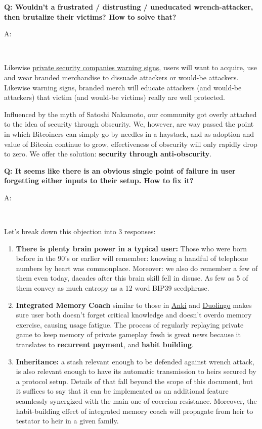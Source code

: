 \documentclass[12pt,a4paper]{article}
\newenvironment{question}[1]{%
  \vspace{0.8em}\noindent\textbf{Q: #1}\par
  \vspace{0.2em}\noindent\begin{itshape}A:\end{itshape}~%
}{\vspace{0.8em}}
\newcommand{\privsecplaque}{https://duckduckgo.com/?q=prosegur+verisure+\%22warning+sign\%22+facade\&iar=images\&t=brave\&iaf=type\%3Aphoto}
\begin{document}
\begin{question}{Wouldn't a frustrated / distrusting / uneducated wrench-attacker, then brutalize their victims? How to solve that?}
Likewise \href{\privsecplaque}{private security companies warning signs}, users will want to acquire, use and wear branded merchandise to dissuade attackers or would-be attackers. Likewise warning signs, branded merch will educate attackers (and would-be attackers) that victim (and would-be victims) really are well protected. 

Influenced by the myth of Satoshi Nakamoto, our community got overly attached to the idea of security through obscurity. We, however, are way passed the point in which Bitcoiners can simply go by needles in a haystack, and as adoption and value of Bitcoin continue to grow, effectiveness of obscurity will only rapidly drop to zero. We offer the solution: \textbf{security through anti-obscurity}.
\end{question}

\begin{question}{It seems like there is an obvious single point of failure in user forgetting either inputs to their setup. How to fix it?}
Let's break down this objection into 3 responses:
\begin{enumerate}
 \item \textbf{There is plenty brain power in a typical user:} Those who were born before in the 90's or earlier will remember: knowing a handful of telephone numbers by heart was commonplace. Moreover: we also do remember a few of them even today, dacades after this brain skill fell in disuse. As few as 5 of them convey as much entropy as a 12 word BIP39 seedphrase.
 \item \textbf{Integrated Memory Coach} similar to those in \href{https://apps.ankiweb.net/}{Anki} and \href{http://duolingo.com/}{Duolingo} makes sure user both doesn't forget critical knowledge and doesn't overdo memory exercise, causing usage fatigue. The process of regularly replaying private game to keep memory of private gameplay fresh is great news because it translates to \textbf{recurrent payment}, and \textbf{habit building}.
 \item \textbf{Inheritance:} a stash relevant enough to be defended against wrench attack, is also relevant enough to have its automatic transmission to heirs secured by a protocol setup. Details of that fall beyond the scope of this document, but it suffices to say that it can be implemented as an additional feature seamlessly synergized with the main one of coercion resistance. Moreover, the habit-building effect of integrated memory coach will propagate from heir to testator to heir in a given family.
\end{enumerate}
\end{question}
\end{document}
